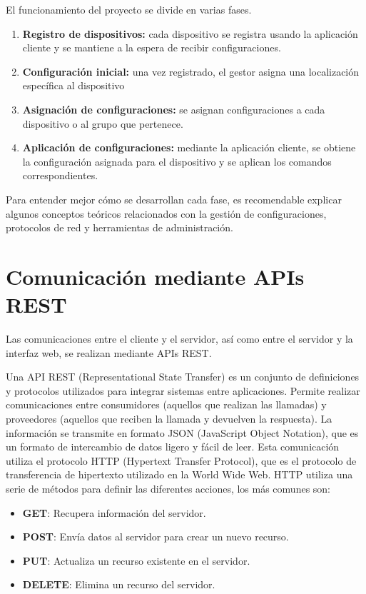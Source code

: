 
El funcionamiento del proyecto se divide en varias fases.
\begin{enumerate}
	\item \textbf{Registro de dispositivos:} cada dispositivo se registra usando la aplicación cliente y se mantiene
	a la espera de recibir configuraciones.
	\item \textbf{Configuración inicial:} una vez registrado, el gestor asigna una localización específica al dispositivo
	\item \textbf{Asignación de configuraciones:} se asignan configuraciones a cada dispositivo o al grupo que pertenece.
	\item \textbf{Aplicación de configuraciones:} mediante la aplicación cliente, se obtiene la configuración asignada
	para el dispositivo y se aplican los comandos correspondientes.
\end{enumerate}

Para entender mejor cómo se desarrollan cada fase, es recomendable explicar algunos conceptos teóricos relacionados
con la gestión de configuraciones, protocolos de red y herramientas de administración.

\section{Comunicación mediante APIs REST}\label{sec:comunicacion-mediante-apis-rest}

Las comunicaciones entre el cliente y el servidor, así como entre el servidor y la interfaz web, se realizan mediante
APIs REST.

Una API REST (Representational State Transfer) es un conjunto de definiciones y protocolos utilizados para integrar
sistemas entre aplicaciones\cite{redhatRestAPI}.
Permite realizar comunicaciones entre consumidores (aquellos que realizan las llamadas) y proveedores (aquellos que
reciben la llamada y devuelven la respuesta).
La información se transmite en formato JSON (JavaScript Object Notation), que es un formato de intercambio de datos
ligero y fácil de leer.
Esta comunicación utiliza el protocolo HTTP (Hypertext Transfer Protocol), que es el protocolo de transferencia de
hipertexto utilizado en la World Wide Web.
HTTP utiliza una serie de métodos para definir las diferentes acciones, los más comunes son:
\begin{itemize}
	\item \textbf{GET}: Recupera información del servidor.
	\item \textbf{POST}: Envía datos al servidor para crear un nuevo recurso.
	\item \textbf{PUT}: Actualiza un recurso existente en el servidor.
	\item \textbf{DELETE}: Elimina un recurso del servidor.
\end{itemize}

